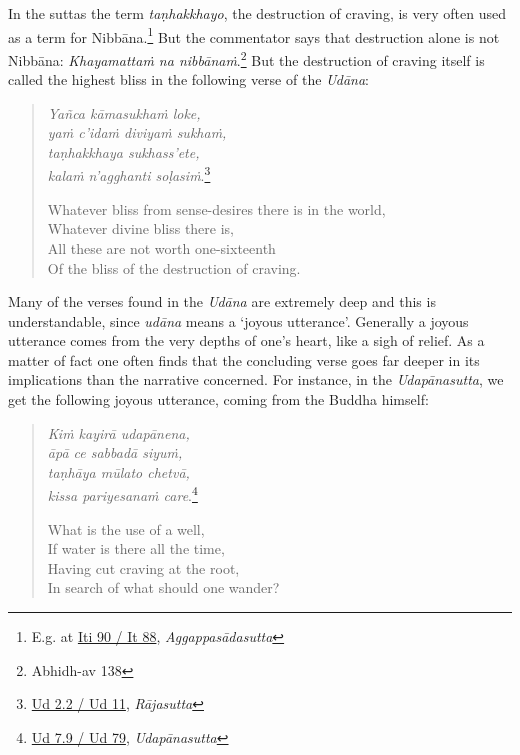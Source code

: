 In the suttas the term \emph{taṇhakkhayo}, the destruction of craving, is very often used as a term for Nibbāna.\footnote{E.g. at \href{https://suttacentral.net/iti90/pli/ms}{Iti 90 / It 88}, \emph{Aggappasādasutta}} But the commentator says that destruction alone is not Nibbāna: \emph{Khayamattaṁ na nibbānaṁ}.\footnote{Abhidh-av 138} But the destruction of craving itself is called the highest bliss in the following verse of the \emph{Udāna}:

\begin{quote}
\emph{Yañca kāmasukhaṁ loke,}\\
\emph{yaṁ c'idaṁ diviyaṁ sukhaṁ,}\\
\emph{taṇhakkhaya sukhass'ete,}\\
\emph{kalaṁ n'agghanti soḷasiṁ}.\footnote{\href{https://suttacentral.net/ud2.2/pli/ms}{Ud 2.2 / Ud 11}, \emph{Rājasutta}}

Whatever bliss from sense-desires there is in the world,\\
Whatever divine bliss there is,\\
All these are not worth one-sixteenth\\
Of the bliss of the destruction of craving.
\end{quote}

Many of the verses found in the \emph{Udāna} are extremely deep and this is understandable, since \emph{udāna} means a `joyous utterance'. Generally a joyous utterance comes from the very depths of one's heart, like a sigh of relief. As a matter of fact one often finds that the concluding verse goes far deeper in its implications than the narrative concerned. For instance, in the \emph{Udapānasutta}, we get the following joyous utterance, coming from the Buddha himself:

\begin{quote}
\emph{Kiṁ kayirā udapānena,}\\
\emph{āpā ce sabbadā siyuṁ,}\\
\emph{taṇhāya mūlato chetvā,}\\
\emph{kissa pariyesanaṁ care}.\footnote{\href{https://suttacentral.net/ud7.9/pli/ms}{Ud 7.9 / Ud 79}, \emph{Udapānasutta}}

What is the use of a well,\\
If water is there all the time,\\
Having cut craving at the root,\\
In search of what should one wander?
\end{quote}

